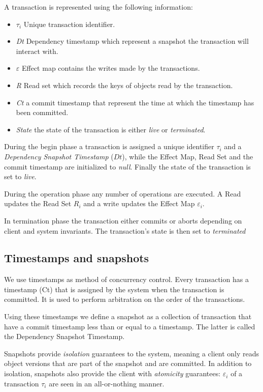 \documentclass[systeme]{compas2022}
\begin{document}
A transaction is represented using the following information:
\begin{itemize}
\item \emph{$\tau_i$} Unique transaction identifier.
\item \emph{Dt} Dependency timestamp which represent a snapshot the transaction will interact with.
\item \emph{$\varepsilon$} Effect map contains the writes made by the transactions.
\item \emph{R} Read set which records the keys of objects read by the transaction.
\item \emph{Ct} a commit timestamp that represent the time at which the timestamp has been committed.
\item \emph{State} the state of the transaction is either \emph{live} or \emph{terminated}.\\
\end{itemize}

During the begin phase a transaction is assigned a unique identifier $\tau_i$ and a \emph{Dependency Snapshot Timestamp} ($Dt$), while the Effect Map, Read Set and the commit timestamp are initialized to \emph{null}. Finally the state of the transaction is set to \emph{live}.

During the operation phase any number of operations are executed.
A Read updates the Read Set $R_i$ and a write updates the Effect Map $\varepsilon_i$.

In termination phase the transaction either commits or aborts depending on client and system invariants. 
The transaction's state is then set to \emph{terminated}

\subsection{Timestamps and snapshots}

We use timestamps as method of concurrency control.
Every transaction has a timestamp (Ct) that is assigned by the system when the transaction is committed.
It is used to perform arbitration on the order of the transactions.

Using these timestamps we define a snapshot as a collection of transaction that have a commit timestamp less than or equal to a timestamp.
The latter is called the Dependency Snapshot Timestamp.

Snapshots provide \emph{isolation} guarantees to the system, meaning a client only reads object versions that are part of the snapshot and are committed. 
In addition to isolation, snapshots also provide the client with \emph{atomicity} guarantees: $\varepsilon_i$ of a transaction $\tau_i$ are seen in an all-or-nothing manner.
\end{document}
